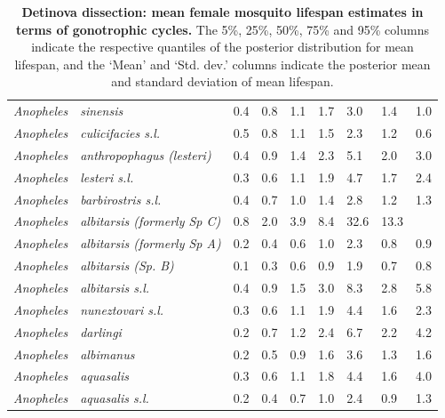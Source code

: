 \documentclass[12pt]{article}
\begin{document}
\begin{table}[htbp!]
\begin{tabular}{l|l|l|l|l|l|l|l|l}
		\textit{Anopheles} & \textit{sinensis} & 0.4 & 0.8 & 1.1 & 1.7 & 3.0 & 1.4 & 1.0 \\
		\textit{Anopheles} & \textit{culicifacies s.l.} & 0.5 & 0.8 & 1.1 & 1.5 & 2.3 & 1.2 & 0.6 \\
		\textit{Anopheles} & \textit{anthropophagus (lesteri)} & 0.4 & 0.9 & 1.4 & 2.3 & 5.1 & 2.0 &
		3.0 \\
		\textit{Anopheles} & \textit{lesteri s.l.} & 0.3 & 0.6 & 1.1 & 1.9 & 4.7 & 1.7 & 2.4 \\
		\textit{Anopheles} & \textit{barbirostris s.l.} & 0.4 & 0.7 & 1.0 & 1.4 & 2.8 & 1.2 & 1.3 \\
		\textit{Anopheles} & \textit{albitarsis (formerly Sp C)} & 0.8 & 2.0 & 3.9 & 8.4 &
		32.6 & 13.3 & \text{$>$100} \\
		\textit{Anopheles} & \textit{albitarsis (formerly Sp A)} & 0.2 & 0.4 & 0.6 & 1.0 & 2.3 & 0.8
		& 0.9 \\
		\textit{Anopheles} & \textit{albitarsis (Sp. B)} & 0.1 & 0.3 & 0.6 & 0.9 & 1.9 & 0.7 & 0.8
		\\
		\textit{Anopheles} & \textit{albitarsis s.l.} & 0.4 & 0.9 & 1.5 & 3.0 & 8.3 & 2.8 & 5.8 \\
		\textit{Anopheles} & \textit{nuneztovari s.l.} & 0.3 & 0.6 & 1.1 & 1.9 & 4.4 & 1.6 & 2.3 \\
		\textit{Anopheles} & \textit{darlingi} & 0.2 & 0.7 & 1.2 & 2.4 & 6.7 & 2.2 & 4.2 \\
		\textit{Anopheles} & \textit{albimanus} & 0.2 & 0.5 & 0.9 & 1.6 & 3.6 & 1.3 & 1.6 \\
		\textit{Anopheles} & \textit{aquasalis} & 0.3 & 0.6 & 1.1 & 1.8 & 4.4 & 1.6 & 4.0 \\
		\textit{Anopheles} & \textit{aquasalis s.l.} & 0.2 & 0.4 & 0.7 & 1.0 & 2.4 & 0.9 & 1.3 \\
	\end{tabular}
	\caption{\textbf{Detinova dissection: mean female mosquito lifespan estimates in terms of gonotrophic cycles.} The 5\%, 25\%, 50\%, 75\% and 95\% columns indicate the respective quantiles of the posterior distribution for mean lifespan, and the `Mean' and `Std. dev.' columns indicate the posterior mean and standard deviation of mean lifespan.}
	\label{tab:detinova_lifespan_gonotrophic}%
\end{table}
\end{document}
